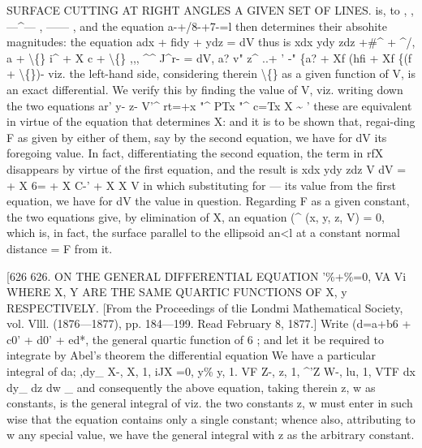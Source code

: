 \documentclass[12pt,a4paper]{article}
\begin{document}
SURFACE CUTTING AT RIGHT ANGLES A GIVEN SET OF LINES.
is,
to
,
,---\textasciicircum{}---
,
------
,
and
the
equation
a-+/8-+7-=l
then
determines
their
absohite magnitudes:
the equation adx + fidy + \textbullet{}ydz = dV thus
is
xdx
ydy
zdz
+\#\textasciicircum{} +
\textasciicircum{}/,
a\guillemotright{} + \textbackslash\{\}
i\textasciicircum{} + X
c\guillemotright{} + \textbackslash\{\}
,,,
\textasciicircum{}\textasciicircum{}
J\textasciicircum{}r- = dV,
a?
v"
z\textasciicircum{}
..+
'
-"
\{a? + Xf
(hfi + Xf
\{(f + \textbackslash\{\})-
viz.
the
left-hand
side,
considering
therein
\textbackslash\{\}
as
a
given
function
of
V,
is
an
exact
differential.
We
verify
this
by
finding
the
value
of
V,
viz.
writing
down
the
two
equations
ar'
y-
z-
V'\textasciicircum{}
rt=+x
"\textasciicircum{} PTx
"\textasciicircum{} c=Tx
X \textasciitilde{}
'
these
are
equivalent
in
virtue
of
the
equation
that
determines
X:
and
it
is
to
be
shown
that,
regai-ding F
as
given
by
either
of them, say by the
second
equation, we
have
for dV
its
foregoing
value.
In
fact,
differentiating
the
second
equation,
the
term
in
rfX disappears by virtue of the
first equation, and the
result
is
xdx
ydy
zdz
V dV
\guillemotleft{}= + X
6= + X
C-' + X
X
V
in
which
substituting
for
---
its
value
from
the
first
equation, we
have
for dV
the
value
in
question.
Regarding F
as
a
given
constant,
the
two
equations
give,
by
elimination
of
X, an
equation
(\textasciicircum{} (x,
y,
z, V) = 0,
which
is,
in
fact,
the
surface
parallel
to the
ellipsoid
an<l
at a constant normal distance = F from
it.

[626
626.
ON
THE GENERAL
DIFFERENTIAL
EQUATION '\%+\%=0,
VA
Vi
WHERE
X, Y ARE THE SAME QUARTIC
FUNCTIONS OF
X, y RESPECTIVELY.
[From the Proceedings of tlie Londmi Mathematical
Society,
vol.
Vlll. (1876---1877),
pp. 184---199.
Read February
8,
1877.]
Write (d=a+b6 + c0' + d0' + ed*, the
general
quartic
function
of 6
;
and
let
it be
required
to integrate by Abel's theorem
the
differential equation
We have
a particular integral of
da; ,dy\_
X-,
X,
1,
iJX
=0,
y\%
y,
1.
VF
Z-,
z,
1,
\textasciicircum{}'Z
W-,
lu,
1,
VTF
dx
dy\_
dz
dw \_
and
consequently the
above
equation,
taking
therein
z, w
as
constants,
is
the
general
integral of
viz.
the
two
constants
z, w
must
enter
in
such
wise
that
the
equation
contains only
a
single
constant;
whence
also, attributing to w any
special
value, we have
the general
integral with z as the arbitrary constant.
\end{document}
